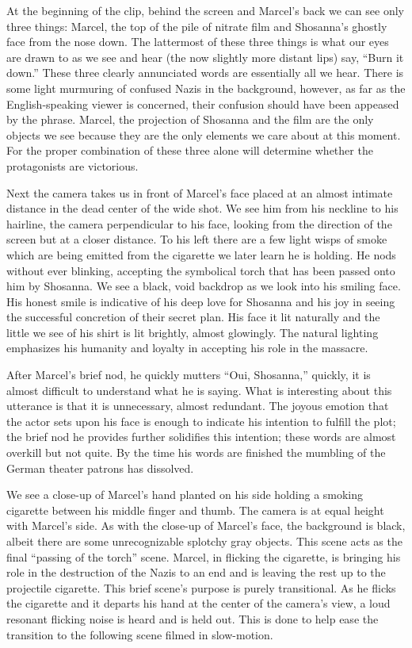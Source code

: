 \documentclass[12pt]{article}
\begin{document}
\begin{flushleft}
At the beginning of the clip, behind the screen and Marcel's back we can
see only three things: Marcel, the top of the pile of nitrate film and 
Shosanna's ghostly face from the nose down. The lattermost of these 
three things is what our eyes are drawn to as we see and hear (the now 
slightly more distant lips) say, “Burn it down.” These three clearly 
annunciated words are essentially all we hear. There is some light murmuring 
of confused Nazis in the background, however, as far as the English-speaking 
viewer is concerned, their confusion should have been appeased by the phrase. 
Marcel, the projection of Shosanna and the film are the only objects we see 
because they are the only elements we care about at this moment. For the 
proper combination of these three alone will determine whether the 
protagonists are victorious.

Next the camera takes us in front of Marcel's face placed at an almost intimate 
distance in the dead center of the wide shot. We see him from his neckline 
to his hairline, the camera perpendicular to his face, looking from the 
direction of the screen but at a closer distance. To his left there are a few 
light wisps of smoke which are being emitted from the cigarette we later learn 
he is holding. He nods without ever blinking, accepting the symbolical torch 
that has been passed onto him by Shosanna. We see a black, void backdrop as 
we look into his smiling face. His honest smile is indicative of his deep 
love for Shosanna and his joy in seeing the successful concretion of their 
secret plan. His face it lit naturally and the little we see of his shirt 
is lit brightly, almost glowingly. The natural lighting emphasizes his 
humanity and loyalty in accepting his role in the massacre.

After Marcel's brief nod, he quickly mutters “Oui, Shosanna,” quickly, it is
almost difficult to understand what he is saying. What is interesting about 
this utterance is that it is unnecessary, almost redundant. The joyous 
emotion that the actor sets upon his face is enough to indicate his intention 
to fulfill the plot; the brief nod he provides further solidifies this 
intention; these words are almost overkill but not quite. By the time 
his words are finished the mumbling of the German theater patrons has dissolved.

We see a close-up of Marcel's hand planted on his side holding a smoking 
cigarette between his middle finger and thumb. The camera is at equal 
height with Marcel's side. As with the close-up of Marcel's face, the 
background is black, albeit there are some unrecognizable splotchy gray 
objects. This scene acts as the final “passing of the torch” scene. 
Marcel, in flicking the cigarette, is bringing his role in the 
destruction of the Nazis to an end and is leaving the rest up to the 
projectile cigarette. This brief scene's purpose is purely transitional. 
As he flicks the cigarette and it departs his hand at the center of the 
camera's view, a loud resonant flicking noise is heard and is held out. 
This is done to help ease the transition to the following scene filmed in 
slow-motion.


\end{flushleft}
\end{document}
